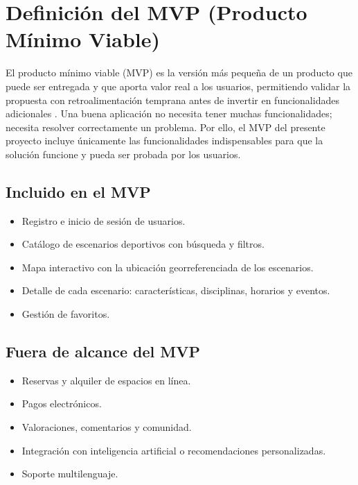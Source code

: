 
\section{Definici\'on del MVP (Producto M\'inimo Viable)}

El producto m\'inimo viable (MVP) es la versi\'on m\'as peque\~na de un producto que
puede ser entregada y que aporta valor real a los usuarios, permitiendo
validar la propuesta con retroalimentaci\'on temprana antes de invertir en
funcionalidades adicionales \citep{larman2004}. Una buena aplicaci\'on no
necesita tener muchas funcionalidades; necesita resolver correctamente un
problema. Por ello, el MVP del presente proyecto incluye \'unicamente las
funcionalidades indispensables para que la soluci\'on funcione y pueda ser
probada por los usuarios.

\subsection{Incluido en el MVP}

\begin{itemize}
  \item Registro e inicio de sesi\'on de usuarios.
  \item Cat\'alogo de escenarios deportivos con b\'usqueda y filtros.
  \item Mapa interactivo con la ubicaci\'on georreferenciada de los escenarios.
  \item Detalle de cada escenario: caracter\'isticas, disciplinas, horarios y
    eventos.
  \item Gesti\'on de favoritos.
\end{itemize}

\subsection{Fuera de alcance del MVP}

\begin{itemize}
  \item Reservas y alquiler de espacios en l\'inea.
  \item Pagos electr\'onicos.
  \item Valoraciones, comentarios y comunidad.
  \item Integraci\'on con inteligencia artificial o recomendaciones
    personalizadas.
  \item Soporte multilenguaje.
\end{itemize}

